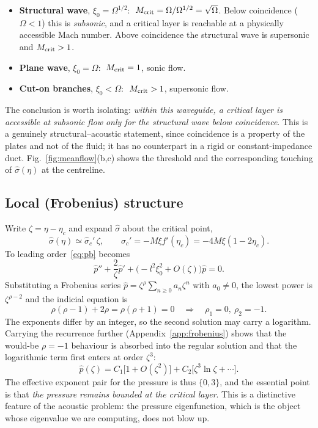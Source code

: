 \documentclass[11pt,a4paper]{article}
\newcommand{\Om}{\Omega}
\newcommand{\sig}{\hat\sigma}
\theoremstyle{plain}
\theoremstyle{remark}
\begin{document}
\begin{itemize}[leftmargin=1.6em,itemsep=2pt]
\item \textbf{Structural wave}, $\xi_0=\Om^{1/2}$: $\;M_{\rm crit}=\Om/\Om^{1/2}=\sqrt\Om$. Below
coincidence ($\Om<1$) this is \emph{subsonic}, and a critical layer is reachable at a physically
accessible Mach number. Above coincidence the structural wave is supersonic and $M_{\rm crit}>1$.
\item \textbf{Plane wave}, $\xi_0=\Om$: $\;M_{\rm crit}=1$, sonic flow.
\item \textbf{Cut-on branches}, $\xi_0<\Om$: $\;M_{\rm crit}>1$, supersonic flow.
\end{itemize}

\noindent The conclusion is worth isolating: \emph{within this waveguide, a critical layer is
accessible at subsonic flow only for the structural wave below coincidence}. This is a genuinely
structural--acoustic statement, since coincidence is a property of the plates and not of the fluid;
it has no counterpart in a rigid or constant-impedance duct. Fig.~\ref{fig:meanflow}(b,c) shows the
threshold and the corresponding touching of $\sig(\eta)$ at the centreline.

\subsection{Local (Frobenius) structure}
Write $\zeta=\eta-\eta_c$ and expand $\sig$ about the critical point,
\begin{equation}
\sig(\eta)\simeq\sig_c'\,\zeta,\qquad
\sig_c'=-M\xi f'(\eta_c)=-4M\xi(1-2\eta_c).
\end{equation}
To leading order~\eqref{eq:pb} becomes
\begin{equation}
\hat p''+\frac{2}{\zeta}\hat p'+\bigl(-l^2\xi_0^2+O(\zeta)\bigr)\hat p=0 .
\label{eq:local}
\end{equation}
Substituting a Frobenius series $\hat p=\zeta^\rho\sum_{n\ge0}a_n\zeta^n$ with $a_0\ne0$, the lowest
power is $\zeta^{\rho-2}$ and the indicial equation is
\begin{equation}
\rho(\rho-1)+2\rho=\rho(\rho+1)=0
\quad\Longrightarrow\quad
\rho_1=0,\ \rho_2=-1 .
\label{eq:indicial}
\end{equation}
The exponents differ by an integer, so the second solution may carry a logarithm. Carrying the
recurrence further (Appendix~\ref{app:frobenius}) shows that the would-be $\rho=-1$ behaviour is
absorbed into the regular solution and that the logarithmic term first enters at order $\zeta^3$:
\begin{equation}
\hat p(\zeta)=C_1\bigl[1+O(\zeta^2)\bigr]+C_2\bigl[\zeta^3\ln\zeta+\cdots\bigr].
\label{eq:frob}
\end{equation}
The effective exponent pair for the pressure is thus $\{0,3\}$, and the essential point is that
\emph{the pressure remains bounded at the critical layer}. This is a distinctive feature of the
acoustic problem: the pressure eigenfunction, which is the object whose eigenvalue we are computing,
does not blow up.
\end{document}
